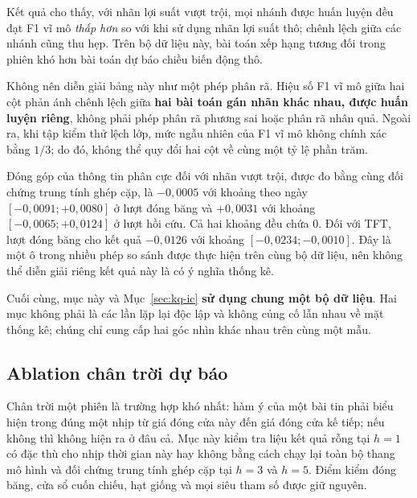 \documentclass[12pt, a4paper, oneside]{report}
\begin{document}
Kết quả cho thấy, với nhãn lợi suất vượt trội, mọi nhánh được huấn luyện đều đạt F1 vĩ mô \emph{thấp hơn} so với khi sử dụng nhãn lợi suất thô; chênh lệch giữa các nhánh cũng thu hẹp. Trên bộ dữ liệu này, bài toán xếp hạng tương đối trong phiên khó hơn bài toán dự báo chiều biến động thô.

Không nên diễn giải bảng này như một phép phân rã. Hiệu số F1 vĩ mô giữa hai cột phản ánh chênh lệch giữa \textbf{hai bài toán gán nhãn khác nhau, được huấn luyện riêng}, không phải phép phân rã phương sai hoặc phân rã nhân quả. Ngoài ra, khi tập kiểm thử lệch lớp, mức ngẫu nhiên của F1 vĩ mô không chính xác bằng $1/3$; do đó, không thể quy đổi hai cột về cùng một tỷ lệ phần trăm.

Đóng góp của thông tin phân cực đối với nhãn vượt trội, được đo bằng cùng đối chứng trung tính ghép cặp, là $-0{,}0005$ với khoảng theo ngày $[-0{,}0091; +0{,}0080]$ ở lượt đóng băng và $+0{,}0031$ với khoảng $[-0{,}0065; +0{,}0124]$ ở lượt hồi cứu. Cả hai khoảng đều chứa 0. Đối với TFT, lượt đóng băng cho kết quả $-0{,}0126$ với khoảng $[-0{,}0234; -0{,}0010]$. Đây là một ô trong nhiều phép so sánh được thực hiện trên cùng bộ dữ liệu, nên không thể diễn giải riêng kết quả này là có ý nghĩa thống kê.

Cuối cùng, mục này và Mục~\ref{sec:kq-ic} \textbf{sử dụng chung một bộ dữ liệu}. Hai mục không phải là các lần lặp lại độc lập và không củng cố lẫn nhau về mặt thống kê; chúng chỉ cung cấp hai góc nhìn khác nhau trên cùng một mẫu.

\subsection{Ablation chân trời dự báo}
\label{sec:kq-horizon}

Chân trời một phiên là trường hợp khó nhất: hàm ý của một bài tin phải biểu hiện trong đúng một nhịp từ giá đóng cửa này đến giá đóng cửa kế tiếp; nếu không thì không hiện ra ở đâu cả. Mục này kiểm tra liệu kết quả rỗng tại $h = 1$ có đặc thù cho nhịp thời gian này hay không bằng cách chạy lại toàn bộ thang mô hình và đối chứng trung tính ghép cặp tại $h = 3$ và $h = 5$. Điểm kiểm đóng băng, cửa sổ cuốn chiếu, hạt giống và mọi siêu tham số được giữ nguyên.
\end{document}
